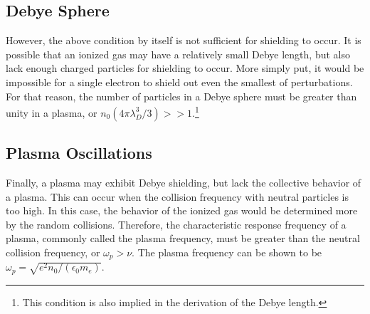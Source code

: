 \subsection{Debye Sphere}
However, the above condition by itself is not sufficient for shielding to occur.
It is possible that an ionized gas may have a relatively small Debye length, but
also lack enough charged particles for shielding to occur. More simply put, it
would be impossible for a single electron to shield out even the smallest of
perturbations. For that reason, the number of particles in a Debye sphere must
be greater than unity in a plasma, or $n_0(4\pi \lambda_D^3/3) >>
1$.\footnote{This condition is also implied in the derivation of the Debye
length.}

\subsection{Plasma Oscillations}
Finally, a plasma may exhibit Debye shielding, but lack the collective behavior
of a plasma. This can occur when the collision frequency with neutral particles
is too high. In this case, the behavior of the ionized gas would be determined
more by the random collisions. Therefore, the characteristic response frequency
of a plasma, commonly called the plasma frequency, must be greater than the
neutral collision frequency, or {$\omega_p > \nu$}. The plasma frequency can be
shown to be $\omega_p = \sqrt{e^2n_0/(\epsilon_0 m_e)}$.

